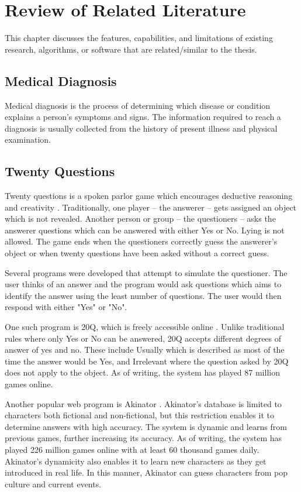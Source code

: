 %
%
%                 

\chapter{Review of Related Literature}
\label{sec:relatedlit}

This chapter discusses the features, capabilities, and limitations of existing research, algorithms, or software 
that are related/similar to the thesis.

\section{Medical Diagnosis}
Medical diagnosis is the process of determining which disease or condition explains a person's symptoms and signs. 
The information required to reach a diagnosis is usually collected from the history of present illness and physical examination.

\section{Twenty Questions}
Twenty questions is a spoken parlor game which encourages deductive reasoning and creativity \cite{wiki:twenty_questions}.
Traditionally, one player -- the answerer -- gets assigned an object which is not revealed.
Another person or group -- the questioners -- asks the answerer questions which can be answered with either Yes or No. 
Lying is not allowed.
The game ends when the questioners correctly guess the answerer's object or when twenty questions have been asked without a correct guess.

Several programs were developed that attempt to simulate the questioner. 
The user thinks of an answer and the program would ask questions which aims to identify the answer using the least number of questions. The user would then respond with either "Yes" or "No".

One such program is 20Q, which is freely accessible online \cite{20q:2016}. 
Unlike traditional rules where only Yes or No can be answered, 20Q accepts different degrees of answer of yes and no.
These include Usually which is described as most of the time the answer would be Yes, and Irrelevant where the question asked by 20Q does not apply to the object.
As of writing, the system has played 87 million games online.

Another popular web program is Akinator \cite{Akinator:2016}.
Akinator's database is limited to characters both fictional and non-fictional, but this restriction enables it to determine answers with high accuracy.
The system is dynamic and learns from previous games, further increasing its accuracy.
As of writing, the system has played 226 million games online with at least 60 thousand games daily.
Akinator's dynamicity also enables it to learn new characters as they get introduced in real life.
In this manner, Akinator can guess characters from pop culture and current events.
